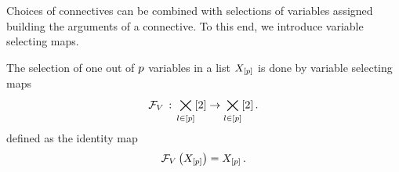 %
%        



Choices of connectives can be combined with selections of variables assigned building the arguments of a connective.
To this end, we introduce variable selecting maps.

\begin{definition}
    \label{def:variableSelector}
    The selection of one out of $p$ variables in a list $X_{[p]}$ is done by variable selecting maps
    \begin{align}
        \mathcal{F}_{V}\,:\, \bigtimes_{l\in[p]}[2] \rightarrow \bigtimes_{l\in[p]}[2] \, .
    \end{align}
    defined as the identity map
    \begin{align*}
        \mathcal{F}_{V}\left(X_{[p]}\right) = X_{[p]} \, .
    \end{align*}
\end{definition}

